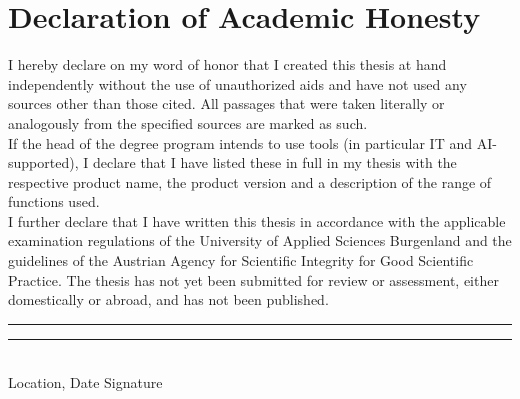 \chapter*{Declaration of Academic Honesty}
I hereby declare on my word of honor that I created this thesis at hand independently without the use of unauthorized aids and have not used any sources other than those cited. All passages that were taken literally or analogously from the specified sources are marked as such. \\

\noindent If the head of the degree program intends to use tools (in particular IT and AI-supported), I declare that I have listed these in full in my thesis with the respective product name, the product version and a description of the range of functions used.\\

\noindent I further declare that I have written this thesis in accordance with the applicable examination regulations of the University of Applied Sciences Burgenland and the guidelines of the Austrian Agency for Scientific Integrity for Good Scientific Practice. The thesis has not yet been submitted for review or assessment, either domestically or abroad, and has not been published.
\vspace{4.5cm}


\noindent \rule[1em]{15em}{0.5pt}  \hfill \rule[1em]{15em}{0.5pt}\\ %
Location, Date \hfill Signature\\


